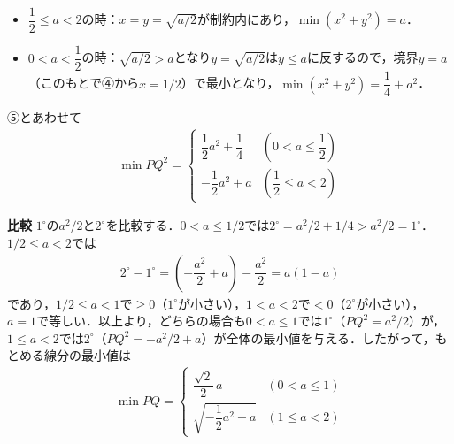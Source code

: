 \documentclass[../../main.tex]{subfiles}
\begin{document}
\begin{itemize}
  \item $\dfrac{1}{2}\le a<2$の時：$x=y=\sqrt{a/2}$が制約内にあり，$\min(x^2+y^2)=a$．
  \item $0<a<\dfrac{1}{2}$の時：$\sqrt{a/2}>a$となり$y=\sqrt{a/2}$は$y\le a$に反するので，境界$y=a$（このもとで④から$x=1/2$）で最小となり，$\min(x^2+y^2)=\dfrac{1}{4}+a^2$．
\end{itemize}
⑤とあわせて
\begin{align}
  \min PQ^2=
  \begin{cases}\displaystyle
    \dfrac{1}{2}a^2+\dfrac{1}{4} & \left(0<a\le\dfrac{1}{2}\right)\\[2mm]
    -\dfrac{1}{2}a^2+a & \left(\dfrac{1}{2}\le a<2\right)
  \end{cases}
\end{align}
\casesend

\textbf{比較} $1^\circ$の$a^2/2$と$2^\circ$を比較する．$0<a\le1/2$では$2^\circ=a^2/2+1/4>a^2/2=1^\circ$．$1/2\le a<2$では
\begin{align}
  2^\circ-1^\circ=\left(-\dfrac{a^2}{2}+a\right)-\dfrac{a^2}{2}=a(1-a)
\end{align}
であり，$1/2\le a<1$で$\ge0$（$1^\circ$が小さい），$1<a<2$で$<0$（$2^\circ$が小さい），$a=1$で等しい．以上より，どちらの場合も$0<a\le1$では$1^\circ$（$PQ^2=a^2/2$）が，$1\le a<2$では$2^\circ$（$PQ^2=-a^2/2+a$）が全体の最小値を与える．したがって，もとめる線分の最小値は
\begin{align}
  \min PQ=
  \begin{cases}\displaystyle
    \dfrac{\sqrt{2}}{2}\,a & (0<a\le1)\\[2mm]
    \sqrt{-\dfrac{1}{2}a^2+a} & (1\le a<2)
  \end{cases}
\end{align}

\newpage
\end{document}
